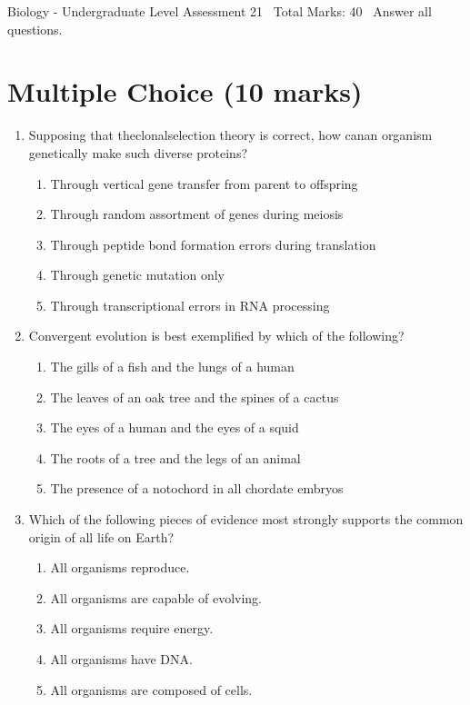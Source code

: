 \documentclass[12pt]{article}
\begin{document}
\begin{center}
Biology - Undergraduate Level Assessment 21 \
Total Marks: 40 \
Answer all questions.
\end{center}

\section*{Multiple Choice (10 marks)}
\begin{enumerate}[label=\arabic*.]
\item Supposing that theclonalselection theory is correct, how canan organism genetically make such diverse proteins?
\begin{enumerate}[label=(\alph*)]
    \item Through vertical gene transfer from parent to offspring
    \item Through random assortment of genes during meiosis
    \item Through peptide bond formation errors during translation
    \item Through genetic mutation only
    \item Through transcriptional errors in RNA processing
\end{enumerate}
\item Convergent evolution is best exemplified by which of the following?
\begin{enumerate}[label=(\alph*)]
    \item The gills of a fish and the lungs of a human
    \item The leaves of an oak tree and the spines of a cactus
    \item The eyes of a human and the eyes of a squid
    \item The roots of a tree and the legs of an animal
    \item The presence of a notochord in all chordate embryos
\end{enumerate}
\item Which of the following pieces of evidence most strongly supports the common origin of all life on Earth?
\begin{enumerate}[label=(\alph*)]
    \item All organisms reproduce.
    \item All organisms are capable of evolving.
    \item All organisms require energy.
    \item All organisms have DNA.
    \item All organisms are composed of cells.

\end{enumerate}
\end{enumerate}
\end{document}
